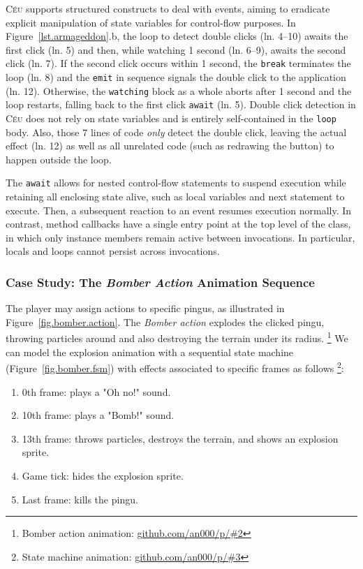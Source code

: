 \documentclass{vgtc}                          %
\newcommand{\CEU}{\textsc{C\'{e}u}\xspace}
\newcommand{\code}[1] {{\small{\texttt{#1}}}}
\begin{document}
\CEU supports structured constructs to deal with events, aiming to eradicate
explicit manipulation of state variables for control-flow purposes.
%
In Figure~\ref{lst.armageddon}.b, the loop to detect double clicks (ln. 4--10)
awaits the first click (ln. 5) and then, while watching 1 second (ln. 6--9),
awaits the second click (ln. 7).
If the second click occurs within 1 second, the \code{break} terminates the
loop (ln. 8) and the \code{emit} in sequence signals the double click to the
application (ln. 12).
Otherwise, the \code{watching} block as a whole aborts after 1 second  and the
loop restarts, falling back to the first click \code{await} (ln. 5).
%
Double click detection in \CEU does not rely on state variables and is entirely
self-contained in the \code{loop} body.
Also, those 7 lines of code \emph{only} detect the double click, leaving the
actual effect (ln. 12) as well as all unrelated code (such as redrawing the
button) to happen outside the loop.

The \code{await} allows for nested control-flow statements to suspend execution
while retaining all enclosing state alive, such as local variables and next
statement to execute.
Then, a subsequent reaction to an event resumes execution normally.
In contrast, method callbacks have a single entry point at the top level of the
class, in which only instance members remain active between invocations.
In particular, locals and loops cannot persist across invocations.

\subsubsection{Case Study: The \emph{Bomber Action} Animation Sequence}
\label{sec.pats.fsms.2}

The player may assign actions to specific pingus, as illustrated in
Figure~\ref{fig.bomber.action}.
%
The \emph{Bomber action} explodes the clicked pingu, throwing particles around
and also destroying the terrain under its radius.%
\footnote{Bomber action animation: \url{github.com/an000/p/#2} }
%
We can model the explosion animation with a sequential state machine
(Figure~\ref{fig.bomber.fsm}) with effects associated to specific frames as
follows%
\footnote{State machine animation: \url{github.com/an000/p/#3} }:
%
\begin{enumerate}
\item 0th frame:  plays a "Oh no!" sound.
\item 10th frame: plays a "Bomb!" sound.
\item 13th frame: throws particles, destroys the terrain, and shows an
                  explosion sprite.
\item Game tick:  hides the explosion sprite.
\item Last frame: kills the pingu.
\end{enumerate}
\end{document}
